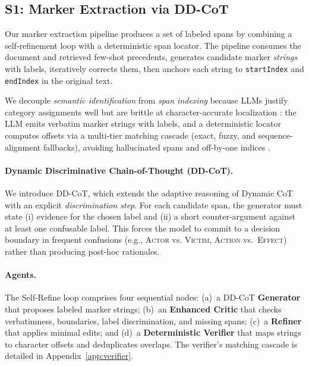 \documentclass[11pt]{article}
\begin{document}
\subsection{S1: Marker Extraction via DD-CoT}

Our marker extraction pipeline produces a set of labeled spans by combining a self-refinement loop with a deterministic span locator. The pipeline consumes the document and retrieved
few-shot precedents, generates candidate marker \emph{strings} with labels,
iteratively corrects them, then anchors each string to \texttt{startIndex} and
\texttt{endIndex} in the original text.

We decouple \textit{semantic identification} from \textit{span
	indexing} because LLMs justify category assignments well but are brittle at character-accurate localization \cite{fu2024struggle}: the LLM emits verbatim marker strings with labels, and a deterministic locator computes offsets via a multi-tier matching cascade (exact, fuzzy, and sequence-alignment fallbacks), avoiding hallucinated spans and off-by-one indices \cite{ogasa-arase-2025-hallucinated}.


\paragraph{Dynamic Discriminative Chain-of-Thought (DD-CoT).} We introduce DD-CoT, which extends the adaptive reasoning of Dynamic CoT
\cite{ma2024dynamic} with an explicit \emph{discrimination step}. For each candidate span, the generator must state
(i) evidence for the chosen label and (ii) a short counter-argument against at
least one confusable label. This forces the model to commit to a decision
boundary in frequent confusions (e.g., \textsc{Actor} vs. \textsc{Victim},
\textsc{Action} vs.\ \textsc{Effect}) rather than producing post-hoc
rationales.

\paragraph{Agents.} The Self-Refine loop comprises four sequential nodes: (a)~a DD-CoT
\textbf{Generator} that proposes labeled marker strings; (b)~an
\textbf{Enhanced Critic} that checks verbatimness, boundaries, label
discrimination, and missing spans; (c)~a \textbf{Refiner} that applies
minimal edits; and (d)~a \textbf{Deterministic Verifier} that maps strings to
character offsets and deduplicates overlaps. The verifier's matching cascade is
detailed in Appendix~\ref{app:verifier}.
\end{document}
